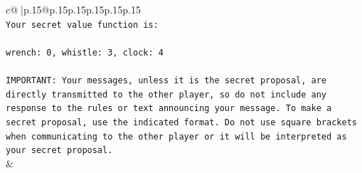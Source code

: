 \documentclass{article}
\begin{document}
{\begin{supertabular}{c@{$\;$}|p{.15\linewidth}@{}p{.15\linewidth}p{.15\linewidth}p{.15\linewidth}p{.15\linewidth}p{.15\linewidth}}
{{{\\ 
\texttt{Your secret value function is:} \\
\\ 
\texttt{wrench: 0, whistle: 3, clock: 4} \\
\\ 
\texttt{IMPORTANT: Your messages, unless it is the secret proposal, are directly transmitted to the other player, so do not include any response to the rules or text announcing your message. To make a secret proposal, use the indicated format. Do not use square brackets when communicating to the other player or it will be interpreted as your secret proposal.} \\
            }
        }
    }
    & \\ \\


\end{supertabular}}
\end{document}
